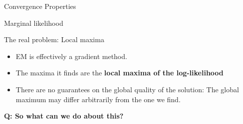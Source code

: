 \documentclass[10pt]{beamer}
\begin{document}
\begin{frame}{Convergence Properties}
\begin{sblock}{Marginal likelihood}
\begin{itemize}
\end{itemize}
\end{sblock}
\begin{sblock}{The real problem: Local maxima}
\begin{minipage}{.6\textwidth}
\begin{itemize}
\item EM is effectively a gradient method.
\item The maxima it finds are the \bf{local maxima of the log-likelihood}
\item There are no guarantees on the global quality of the solution: The global maximum may differ arbitrarily from the one we find.
\end{itemize}
\end{minipage}
\hfill
\begin{minipage}{.35\textwidth}
\end{minipage}

\end{sblock}
\vfill \tiny \bf{Q:} So what can we do about this?
\end{frame}
\end{document}
